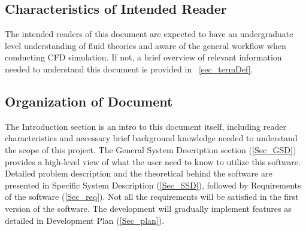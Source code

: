 \documentclass[12pt]{article}
\begin{document}
\subsection{Characteristics of Intended Reader} \label{sec_IntendedReader}

The intended readers of this document are expected to have an undergraduate level understanding of fluid theories and aware of the general workflow when conducting CFD simulation. If not, a brief overview of relevant information needed to understand this document is provided in ~\ref{sec_termDef}.



\subsection{Organization of Document}
The Introduction section is an intro to this document itself, including reader characteristics and necessary brief background knowledge needed to understand the scope of this project. The General System Description section (\ref{Sec_GSD}) provides a high-level view of what the user need to know to utilize this software. Detailed problem description and the theoretical behind the software are presented in Specific System Description (\ref{Sec_SSD}), followed by Requirements of the software (\ref{Sec_req}). Not all the requirements will be satisfied in the first version of the software. The development will gradually implement features as detailed in Development Plan (\ref{Sec_plan}).
\end{document}
